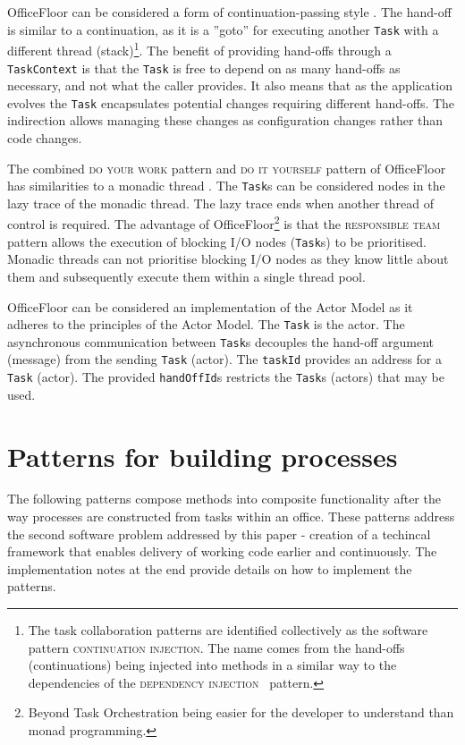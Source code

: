 \documentclass[prodmode]{style/acmlarge}
\begin{document}
OfficeFloor can be considered a form of continuation-passing style
\cite{continuations}.  The hand-off is similar to a continuation, as it is a
''goto'' for executing another \texttt{Task} with a different thread
(stack)\footnote{The task collaboration patterns are identified collectively as
the software pattern \textsc{continuation injection}.  The name comes from the
hand-offs (continuations) being injected into methods in a similar way to the
dependencies of the \textsc{dependency injection}~\cite{ioc} pattern.}.  The
benefit of providing hand-offs through a \texttt{TaskContext} is that the
\texttt{Task} is free to depend on as many hand-offs as necessary, and not what
the caller provides.  It also means that as the application evolves the
\texttt{Task} encapsulates potential changes requiring different hand-offs.  The
indirection allows managing these changes as configuration changes rather than
code changes.

The combined \textsc{do your work} pattern and \textsc{do it yourself} pattern
of OfficeFloor has similarities to a monadic thread \cite{monadic-thread}.  The
\texttt{Task}s can be considered nodes in the lazy trace of the monadic thread. 
The lazy trace ends when another thread of control is required.  The advantage of
OfficeFloor\footnote{Beyond Task Orchestration being easier for the developer to
understand than monad programming.} is that the \textsc{responsible team}
pattern allows the execution of blocking I/O nodes (\texttt{Task}s) to be
prioritised.  Monadic threads can not prioritise blocking I/O nodes as they know
little about them and subsequently execute them within a single thread pool.

OfficeFloor can be considered an implementation of the Actor Model \cite{actors}
as it adheres to the principles of the Actor Model.  The \texttt{Task} is the
actor.  The asynchronous communication between \texttt{Task}s decouples the
hand-off argument (message) from the sending \texttt{Task} (actor).  The
\texttt{taskId} provides an address for a \texttt{Task} (actor).  The provided
\texttt{handOffId}s restricts the \texttt{Task}s (actors) that may be used.




\section{Patterns for building processes}

The following patterns compose methods into composite functionality after the
way processes are constructed from tasks within an office.  These patterns
address the second software problem addressed by this paper - creation of a
techincal framework that enables delivery of working code earlier and
continuously.  The implementation notes at the end provide details on how to
implement the patterns.
\end{document}
